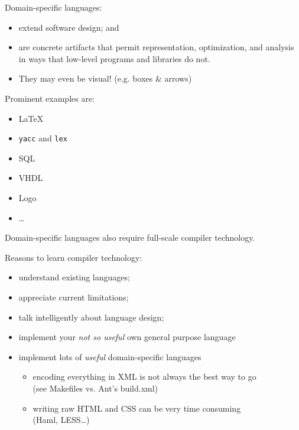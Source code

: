 \begin{slide*}
Domain-specific languages:
\begin{itemize}
\item extend software design; and
\item are concrete artifacts that permit representation, optimization, and analysis in ways
      that low-level programs and libraries do not.
\item They may even be visual! (e.g. boxes \& arrows) 
\end{itemize}
Prominent examples are:
\begin{itemize}
\item \LaTeX
\item {\tt yacc} and {\tt lex}
\item SQL
\item VHDL
\item Logo
\item \ldots
\end{itemize}
Domain-specific languages also require full-scale compiler technology.
\vfil
\end{slide*}

\begin{slide*}
Reasons to learn compiler technology:
\begin{itemize}
\item understand existing languages;
\item appreciate current limitations;
\item talk intelligently about language design;
\item implement your \emph{not so useful} own general purpose language
\item implement lots of \emph{useful} domain-specific languages
\begin{itemize}
\item encoding everything in XML is not always the best way to go\\
	(see Makefiles vs. Ant's build.xml)  
\item writing raw HTML and CSS can be very time consuming\\
(Haml, LESS\ldots)  
\end{itemize}
\end{itemize}
\vfil
\end{slide*}
 
